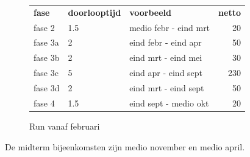 \begin{figure}[htp]
 \centering
\begin{tabular}{lllr}
\textbf{fase} & \textbf{doorlooptijd} & \textbf{voorbeeld} & \textbf{netto}\\
fase 2        & 1.5  & medio febr - eind mrt & 20\\
fase 3a       & 2    & eind febr - eind apr & 50\\
fase 3b       & 2    & eind mrt - eind mei & 30\\
fase 3c       & 5    & eind apr - eind sept & 230\\
fase 3d       & 2    & eind mrt - eind sept & 50\\
fase 4        & 1.5  & eind sept - medio okt & 20\\
\end{tabular}

 \caption{Run vanaf februari}
 \label{fig:febr-run}
\end{figure}



De midterm bijeenkomsten zijn medio november en medio april.

